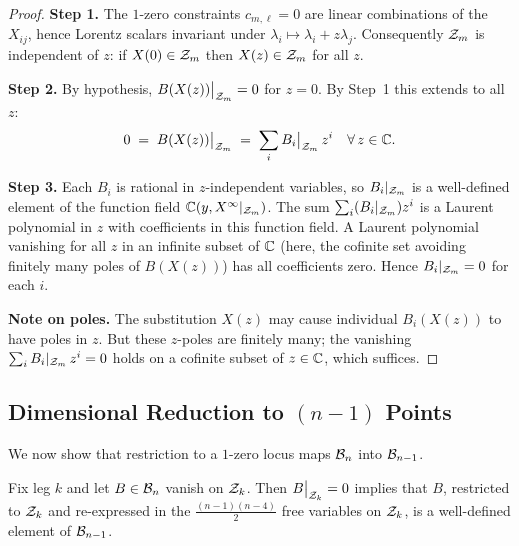 \begin{proof}
\textbf{Step 1.} The $1$-zero constraints $c_{m,\ell} = 0$ are
linear combinations of the $X_{ij}$, hence Lorentz scalars
invariant under $\lambda_i \mapsto \lambda_i + z\lambda_j$.
Consequently $\mathcal{Z}_m$ is independent of $z$: if $X(0) \in \mathcal{Z}_m$
then $X(z) \in \mathcal{Z}_m$ for all $z$.

\textbf{Step 2.} By hypothesis,
$B(X(z))\big|_{\mathcal{Z}_m} = 0$ for $z = 0$. By Step~1 this
extends to all $z$:
\[
  0 \;=\; B(X(z))\big|_{\mathcal{Z}_m}
  \;=\; \sum_i B_i\big|_{\mathcal{Z}_m}\, z^i
  \quad \forall\, z \in \mathbb{C}.
\]

\textbf{Step 3.} Each $B_i$ is rational in $z$-independent
variables, so $B_i|_{\mathcal{Z}_m}$ is a well-defined element of
the function field $\mathbb{C}(y, X^\infty|_{\mathcal{Z}_m})$. The sum
$\sum_i (B_i|_{\mathcal{Z}_m}) z^i$ is a Laurent polynomial in $z$
with coefficients in this function field. A Laurent polynomial
vanishing for all $z$ in an infinite subset of $\mathbb{C}$ (here,
the cofinite set avoiding finitely many poles of $B(X(z))$)
has all coefficients zero. Hence $B_i|_{\mathcal{Z}_m} = 0$ for
each $i$.

\textbf{Note on poles.} The substitution $X(z)$ may cause
individual $B_i(X(z))$ to have poles in $z$. But these
$z$-poles are finitely many; the vanishing
$\sum_i B_i|_{\mathcal{Z}_m}\, z^i = 0$ holds on a cofinite subset
of $z \in \mathbb{C}$, which suffices.
\end{proof}

\subsection{Dimensional Reduction to \texorpdfstring{$(n-1)$}{(n-1)} Points}
\label{ssec:dimred}

We now show that restriction to a $1$-zero locus maps
$\mathcal{B}_n$ into $\mathcal{B}_{n-1}$.

\begin{proposition}
\label{prop:dimred}
Fix leg $k$ and let $B \in \mathcal{B}_n$ vanish on $\mathcal{Z}_k$.
Then $B\big|_{\mathcal{Z}_k} = 0$ implies that $B$, restricted to
$\mathcal{Z}_k$ and re-expressed in the
$\frac{(n-1)(n-4)}{2}$ free variables on $\mathcal{Z}_k$,
is a well-defined element of $\mathcal{B}_{n-1}$.
\end{proposition}

